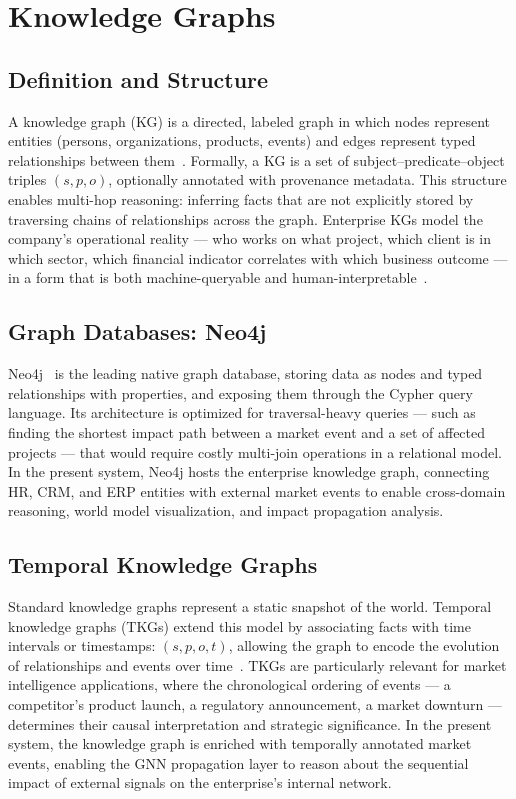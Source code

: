 \section{Knowledge Graphs}

\subsection{Definition and Structure}

A knowledge graph (KG) is a directed, labeled graph in which nodes represent
entities (persons, organizations, products, events) and edges represent typed
relationships between them~\cite{hogan2021knowledge}. Formally, a KG is a
set of subject–predicate–object triples $(s, p, o)$, optionally annotated
with provenance metadata. This structure enables multi-hop reasoning:
inferring facts that are not explicitly stored by traversing chains of
relationships across the graph. Enterprise KGs model the company's
operational reality — who works on what project, which client is in which
sector, which financial indicator correlates with which business outcome —
in a form that is both machine-queryable and human-interpretable~\cite{noy2019industry}.

\subsection{Graph Databases: Neo4j}

Neo4j~\cite{neo4j2024} is the leading native graph database, storing data
as nodes and typed relationships with properties, and exposing them through
the Cypher query language. Its architecture is optimized for
traversal-heavy queries — such as finding the shortest impact path between
a market event and a set of affected projects — that would require costly
multi-join operations in a relational model. In the present system, Neo4j
hosts the enterprise knowledge graph, connecting HR, CRM, and ERP entities
with external market events to enable cross-domain reasoning, world model
visualization, and impact propagation analysis.

\subsection{Temporal Knowledge Graphs}

Standard knowledge graphs represent a static snapshot of the world. Temporal
knowledge graphs (TKGs) extend this model by associating facts with time
intervals or timestamps: $(s, p, o, t)$, allowing the graph to encode the
evolution of relationships and events over time~\cite{trivedi2019dyrep}.
TKGs are particularly relevant for market intelligence applications, where
the chronological ordering of events — a competitor's product launch,
a regulatory announcement, a market downturn — determines their causal
interpretation and strategic significance. In the present system, the
knowledge graph is enriched with temporally annotated market events, enabling
the GNN propagation layer to reason about the sequential impact of external
signals on the enterprise's internal network.

